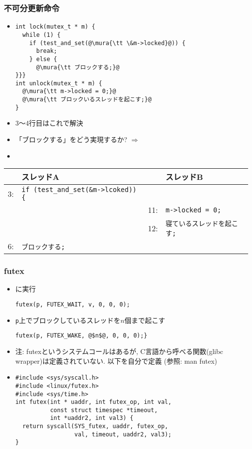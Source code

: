 \documentclass[12pt,dvipdfmx]{beamer}
\begin{document}
\begin{frame}[fragile]
  \frametitle{不可分更新命令}
  \begin{itemize}
  \item []
\begin{lstlisting}
int lock(mutex_t * m) {
  while (1) {  
    if (test_and_set(@\mura{\tt \&m->locked}@)) {
      break;
    } else {
      @\mura{\tt ブロックする;}@
}}}
int unlock(mutex_t * m) {
  @\mura{\tt m->locked = 0;}@
  @\mura{\tt ブロックいるスレッドを起こす;}@
}
\end{lstlisting}
\item 3〜4行目はこれで解決
\item 「ブロックする」をどう実現するか? $\Rightarrow$ 
\item {}
\end{itemize}

\begin{center}
  {\scriptsize
\begin{tabular}{|rl|rl|}
    & スレッドA                       &     & スレッドB         \\\hline
3:  & {\tt if (test\_and\_set(\&m->lcoked)) \{} &     &                   \\
    &                                 & 11:  & {\tt m->locked = 0;} \\
    &                                 & 12: & {\tt 寝ているスレッドを起こす;} \\
6:  & {\tt ブロックする;}             &     & \\
\end{tabular}}
\end{center}
\end{frame}

\begin{frame}[fragile]
  \frametitle{futex}
  \begin{itemize}
  \item {}に実行
    \begin{lstlisting}
futex(p, FUTEX_WAIT, v, 0, 0, 0);
\end{lstlisting}
  \item {\tt p}上でブロックしているスレッドを$n$個まで起こす
\begin{lstlisting}
futex(p, FUTEX_WAKE, @$n$@, 0, 0, 0);}
\end{lstlisting}
\item 注: futexというシステムコールはあるが,
  C言語から呼べる関数(glibc wrapper)は定義されていない. 以下を自分で定義
  (参照: man futex)
\item 
  \begin{lstlisting}
#include <sys/syscall.h>
#include <linux/futex.h>
#include <sys/time.h>
int futex(int * uaddr, int futex_op, int val,
          const struct timespec *timeout,
          int *uaddr2, int val3) {
  return syscall(SYS_futex, uaddr, futex_op,
                 val, timeout, uaddr2, val3);
}
\end{lstlisting}
\end{itemize}
\end{frame}
\end{document}
